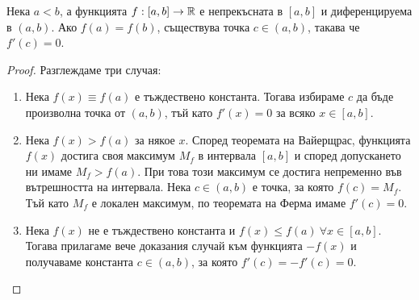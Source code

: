 \documentclass[numbers=endperiod, bibliography=totocnumbered]{scrartcl}
\begin{document}
\begin{theorem}[Рол]
  Нека \( a < b \), а функцията \( f: [a, b] \to \mathbb{R} \) е непрекъсната в \( [a, b] \) и диференцируема в \( (a, b) \). Ако \( f(a) = f(b) \), съществува точка \( c \in (a, b) \), такава че \( f'(c) = 0 \).
\end{theorem}
\begin{proof}
  Разглеждаме три случая:
  \begin{enumerate}
    \item Нека \( f(x) \equiv f(a) \) е тъждествено константа. Тогава избираме \( c \) да бъде произволна точка от \( (a, b) \), тъй като \( f'(x) = 0 \) за всяко \( x \in [a, b] \).
    \item Нека \( f(x) > f(a) \) за някое \( x \). Според теоремата на Вайерщрас, функцията \( f(x) \) достига своя максимум \( M_f \) в интервала \( [a, b] \) и според допускането ни имаме \( M_f > f(a) \). При това този максимум се достига непременно във вътрешността на интервала. Нека \( c \in (a, b) \) е точка, за която \( f(c) = M_f \). Тъй като \( M_f \) е локален максимум, по теоремата на Ферма имаме \( f'(c) = 0 \).
    \item Нека \( f(x) \) не е тъждествено константа и \( f(x) \leq f(a)~\forall x \in [a, b] \). Тогава прилагаме вече доказания случай към функцията \( -f(x) \) и получаваме константа \( c \in (a, b) \), за която \( f'(c) = -f'(c) = 0 \).
  \end{enumerate}
\end{proof}
\end{document}
